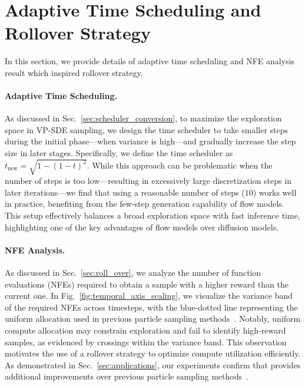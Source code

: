 \section{Adaptive Time Scheduling and Rollover Strategy}
\label{sec:appendix_adaptive_time_and_rollover}
In this section, we provide details of adaptive time scheduling and NFE analysis result which inspired rollover strategy. 
\paragraph{Adaptive Time Scheduling.}
As discussed in Sec.~\ref{sec:scheduler_conversion}, to maximize the exploration space in VP-SDE sampling, we design the time scheduler to take smaller steps during the initial phase—when variance is high—and gradually increase the step size in later stages. Specifically, we define the time scheduler as $t_\text{new} = \sqrt{1-(1-t)^2}$. 
While this approach can be problematic when the number of steps is too low—resulting in excessively large discretization steps in later iterations—we find that using a reasonable number of steps (\eg $10$) works well in practice, benefiting from the few-step generation capability of flow models. This setup effectively balances a broad exploration space with fast inference time, highlighting one of the key advantages of flow models over diffusion models. 

\paragraph{NFE Analysis.}
As discussed in Sec.~\ref{sec:roll_over}, we analyze the number of function evaluations (NFEs) required to obtain a sample with a higher reward than the current one. In Fig.~\ref{fig:temporal_axis_scaling}, we visualize the variance band of the required NFEs across timesteps, with the blue-dotted line representing the uniform allocation used in previous particle sampling methods~\cite{Li2024:SVDD, Singh:2025CoDE}. Notably, uniform compute allocation may constrain exploration and fail to identify high-reward samples, as evidenced by crossings within the variance band. This observation motivates the use of a rollover strategy to optimize compute utilization efficiently. As demonstrated in Sec.~\ref{sec:applications}, our experiments confirm that \Ours{} provides additional improvements over previous particle sampling methods~\cite{Li2024:SVDD, Singh:2025CoDE}.




